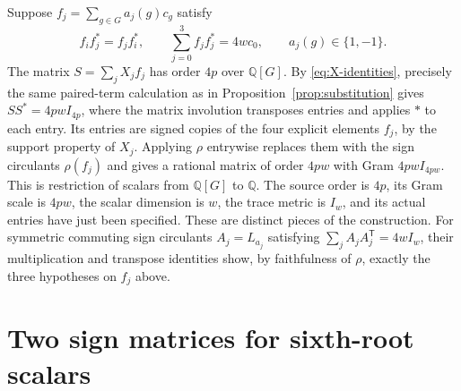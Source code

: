 \documentclass[10pt]{article}
\newcommand{\Q}{\mathbb Q}
\begin{document}
Suppose $f_j=\sum_{g\in G}a_j(g)c_g$ satisfy
\[
 f_if_j^*=f_jf_i^*,\qquad
 \sum_{j=0}^3f_jf_j^*=4w c_0,\qquad a_j(g)\in\{1,-1\}.
\]
The matrix $S=\sum_jX_jf_j$ has order $4p$ over $\Q[G]$.
By \eqref{eq:X-identities}, precisely the same paired-term calculation
as in Proposition~\ref{prop:substitution} gives
$SS^*=4pwI_{4p}$, where the matrix involution transposes entries and
applies $*$ to each entry. Its entries are signed copies of the four
explicit elements $f_j$, by the support property of $X_j$.
Applying $\rho$ entrywise replaces them with the sign circulants
$\rho(f_j)$ and gives a rational matrix of order $4pw$ with Gram
$4pwI_{4pw}$. This is restriction of scalars from $\Q[G]$ to $\Q$.
The source order is $4p$, its Gram scale is $4pw$, the scalar dimension is
$w$, the trace metric is $I_w$, and its actual entries have just been
specified. These are distinct pieces of the construction.
For symmetric commuting sign circulants $A_j=L_{a_j}$ satisfying
$\sum_j A_jA_j^{\mathsf T}=4wI_w$, their multiplication
and transpose identities show, by faithfulness of $\rho$, exactly the
three hypotheses on $f_j$ above.


\section{Two sign matrices for sixth-root scalars}\label{sec:sign-pair}
\end{document}

